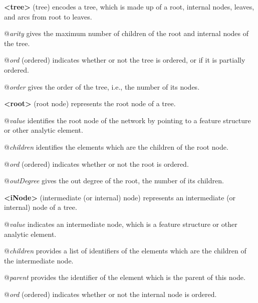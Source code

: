 \begin{sansreflist}
  
\item [\textbf{<tree>}] (tree) encodes a tree, which is made up of a root, internal nodes, leaves, and arcs from root to leaves.\hfil\\[-10pt]\begin{sansreflist}
    \item[@{\itshape arity}]
  gives the maximum number of children of the root and internal nodes of the tree.
    \item[@{\itshape ord}]
  (ordered) indicates whether or not the tree is ordered, or if it is partially ordered.
    \item[@{\itshape order}]
  gives the order of the tree, i.e., the number of its nodes.
\end{sansreflist}  
\item [\textbf{<root>}] (root node) represents the root node of a tree.\hfil\\[-10pt]\begin{sansreflist}
    \item[@{\itshape value}]
  identifies the root node of the network by pointing to a feature structure or other analytic element.
    \item[@{\itshape children}]
  identifies the elements which are the children of the root node.
    \item[@{\itshape ord}]
  (ordered) indicates whether or not the root is ordered.
    \item[@{\itshape outDegree}]
  gives the out degree of the root, the number of its children.
\end{sansreflist}  
\item [\textbf{<iNode>}] (intermediate (or internal) node) represents an intermediate (or internal) node of a tree.\hfil\\[-10pt]\begin{sansreflist}
    \item[@{\itshape value}]
  indicates an intermediate node, which is a feature structure or other analytic element.
    \item[@{\itshape children}]
  provides a list of identifiers of the elements which are the children of the intermediate node.
    \item[@{\itshape parent}]
  provides the identifier of the element which is the parent of this node.
    \item[@{\itshape ord}]
  (ordered) indicates whether or not the internal node is ordered.

\end{sansreflist}
\end{sansreflist}
